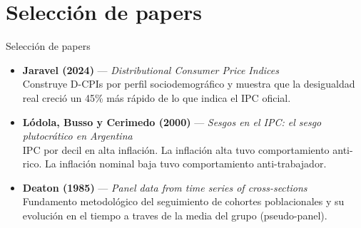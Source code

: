 \documentclass{beamer}
\begin{document}
\section{Selección de papers}
\begin{frame}{Selección de papers}
    \begin{itemize}
        \item \textbf{Jaravel (2024)} --- \textit{Distributional Consumer Price Indices}\\
        Construye D-CPIs por perfil sociodemográfico y muestra que la desigualdad real creció un 45\% más rápido de lo que indica el IPC oficial.
        \vspace{0.4em}
        \item \textbf{Lódola, Busso y Cerimedo (2000)} --- \textit{Sesgos en el IPC: el sesgo plutocrático en Argentina}\\
        IPC por decil en alta inflación. La inflación alta tuvo comportamiento anti-rico. La inflación nominal baja tuvo comportamiento anti-trabajador.
        \vspace{0.4em}
        \item \textbf{Deaton (1985)} --- \textit{Panel data from time series of cross-sections}\\
        Fundamento metodológico del seguimiento de cohortes poblacionales y su evolución en el tiempo a traves de la media del grupo (pseudo-panel).
    \end{itemize}
\end{frame}
\end{document}
